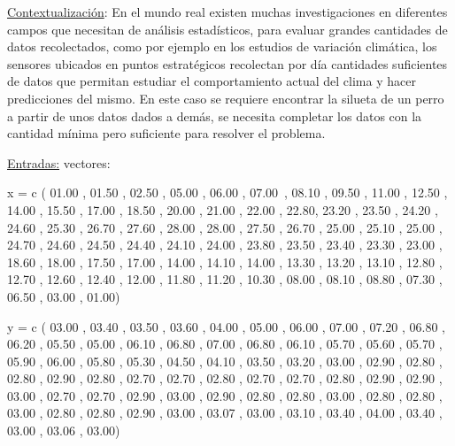 \documentclass[12pt]{article}
\renewcommand{\_}{\kern-1.5pt\textunderscore\kern-1.5pt}
\begin{document}
\begin{adjustwidth}{0.5in}{0.0in}
\begin{justify}
\uline{Contextualización}: En el mundo real existen muchas investigaciones en diferentes campos que necesitan de análisis estadísticos, para evaluar grandes cantidades de datos recolectados, como por ejemplo en los estudios de variación climática, los sensores ubicados en puntos estratégicos recolectan por día cantidades suficientes de datos que permitan estudiar el comportamiento actual del clima y hacer predicciones del mismo. En este caso se requiere encontrar la silueta de un perro a partir de unos datos dados a demás, se necesita completar los datos con la cantidad mínima pero suficiente para resolver el problema.
\end{justify}\par

\end{adjustwidth}


\vspace{\baselineskip}
\begin{justify}
\uline{Entradas:} vectores: 
\end{justify}\par

\begin{justify}
x = c ( 01.00 , 01.50 , 02.50 , 05.00 , 06.00 , 07.00\ , 08.10 , 09.50 , 11.00 , 12.50 , 14.00 , 15.50 , 17.00 , 18.50 , 20.00 , 21.00 , 22.00 , 22.80,  23.20 , 23.50 , 24.20 , 24.60 , 25.30 , 26.70 , 27.60 , 28.00 , 28.00 , 27.50 , 26.70 , 25.00 , 25.10 , 25.00 , 24.70 , 24.60 , 24.50 , 24.40 , 24.10 , 24.00 , 23.80 , 23.50 , 23.40 , 23.30 , 23.00 , 18.60 , 18.00 , 17.50 , 17.00 , 14.00 , 14.10 , 14.00 , 13.30 , 13.20 , 13.10 , 12.80 , 12.70 , 12.60 , 12.40 , 12.00 , 11.80 , 11.20 , 10.30 , 08.00 , 08.10 , 08.80 , 07.30 , 06.50 , 03.00 , 01.00)
\end{justify}\par

\begin{justify}
y = c ( 03.00 , 03.40 , 03.50 , 03.60 , 04.00 , 05.00 , 06.00 , 07.00 , 07.20 , 06.80 , 06.20 , 05.50 , 05.00 , 06.10 , 06.80 , 07.00 , 06.80 , 06.10 , 05.70 , 05.60 , 05.70 , 05.90 , 06.00 , 05.80 , 05.30 , 04.50 , 04.10 , 03.50 , 03.20 , 03.00 , 02.90 , 02.80 , 02.80 , 02.90 , 02.80 , 02.70 , 02.70 , 02.80 , 02.70 , 02.70 , 02.80 , 02.90 , 02.90 , 03.00 , 02.70 , 02.70 , 02.90 , 03.00 , 02.90 , 02.80 , 02.80 , 03.00 , 02.80 , 02.80 , 03.00 , 02.80 , 02.80 , 02.90 , 03.00 , 03.07 , 03.00 , 03.10 , 03.40 , 04.00 , 03.40 , 03.00 , 03.06 , 03.00)
\end{justify}\par
\end{document}
